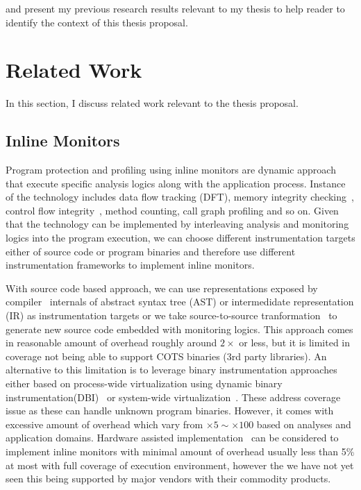  and present my previous research
results relevant to my thesis to help reader to identify the context of this
thesis proposal.

\section{Related Work}
\label{sec:related}
In this section, I discuss related work relevant to the thesis proposal. 

\subsection{Inline Monitors}
\label{ssec:inline}

Program protection and profiling using inline monitors are dynamic approach
that execute specific analysis logics along with the application process.
Instance of the technology includes data flow tracking (DFT), memory integrity
checking~\cite{memcheck, drmemory:cgo2011}, control flow integrity~\cite{cfi},
method counting, call graph profiling and so on. Given that the technology can
be implemented by interleaving analysis and monitoring logics into the program
execution, we can choose different instrumentation targets either of source
code or program binaries and therefore use different instrumentation frameworks
to implement inline monitors.

With source code based approach, we can use representations exposed  by
compiler~\cite{llvm:cgo04} internals of abstract syntax tree (AST) or
intermedidate representation (IR) as instrumentation targets or we take
source-to-source tranformation~\cite{txl, cil} to generate new source code
embedded with monitoring logics. This approach comes in reasonable amount of
overhead roughly around $2\times$ or less, but it is limited in coverage not
being able to support COTS binaries (\ie 3rd party libraries).  An alternative
to this limitation is to leverage binary instrumentation approaches either
based on process-wide virtualization using dynamic binary
instrumentation(DBI)~\cite{pin:pldi2005, dynamorio, valgrind} or system-wide
virtualization~\cite{qemu:usenix05, xen:sosp2003}. These address coverage issue
as these can handle unknown program binaries. However, it comes with excessive
amount of overhead which vary from $\times 5 \sim \times 100$ based on analyses
and application domains. Hardware assisted
implementation~\cite{raksha:isca2007, lba:isca2008} can be considered to
implement inline monitors with minimal amount of overhead usually less than 5\%
at most with full coverage of execution environment, however the we have not
yet seen this being supported by major vendors with their commodity products.

